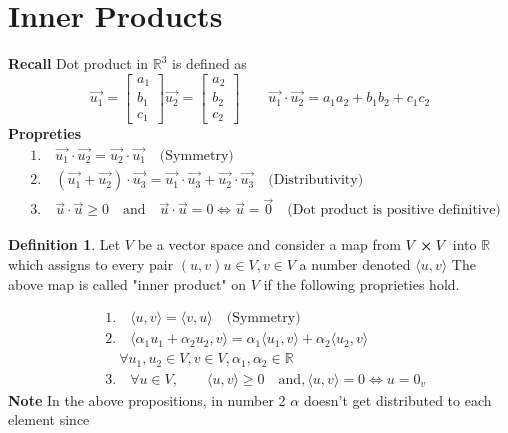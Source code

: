 \documentclass[
12pt,
]{article}
\newcommand{\la}{\langle}
\newcommand{\ra}{\rangle}
\theoremstyle{definition}
\theoremstyle{definition}
\theoremstyle{definition}
\newtheorem{Definition}{Definition}[section]
\theoremstyle{definition}
\begin{document}
\section{Inner Products}
\textbf{Recall} Dot product in $\mathbb{R}^3$ is defined as \\
\begin{equation*}
\vec{u_1} = 
	\begin{bmatrix}
	a_1 \\
	b_1 \\
	c_1
	\end{bmatrix}
\vec{u_2} = 
	\begin{bmatrix}
	a_2 \\
	b_2 \\
	c_2
	\end{bmatrix}
	\qquad \vec{u_1}\cdot{} \vec{u_2}= a_1a_2 + b_1b_2 + c_1c_2
\end{equation*}
\textbf{Propreties}
\begin{align*}
&1. \quad \vec{u_1} \cdot \vec{u_2} = \vec{u_2} \cdot \vec{u_1} \quad \text{(Symmetry)} \\
&2. \quad (\vec{u_1}+\vec{u_2})\cdot \vec{u_3} = \vec{u_1} \cdot \vec{u_3} + \vec{u_2} \cdot \vec{u_3} \quad \text{(Distributivity)} \\
&3. \quad \vec{u} \cdot \vec{u} \geq 0 \quad \text{and} \quad \vec{u} \cdot \vec{u} = 0 \iff \vec{u} = \vec{0} \quad \text{(Dot product is positive definitive)}
\end{align*}
\begin{Definition}
	Let $V$ be a vector space and consider a map from $V\cross V$ into $\mathbb{R}$ which assigns to every pair $(u,v) u \in V, v \in V$ a number denoted $ \la  u,v \ra $ \newline
	The above map is called "inner product" on $V$ if the following proprieties hold.
\end{Definition}
\begin{align*}
&1.\quad  \la  u,v\ra =  \la  v,u\ra \quad \text{(Symmetry)} \\
&2. \quad  \la  \alpha_1 u_1 + \alpha_2 u_2 , v\ra = \alpha_1  \la  u_1,v\ra + \alpha_2 \la  u_2, v\ra \\
&  \quad\forall u_1, u_2 \in V, v\in V , \alpha_1 , \alpha_2 \in \mathbb{R} \\
&3. \quad \forall u \in V , \qquad  \la  u,v\ra \geq 0 \quad \text{and} ,  \la  u,v\ra = 0 \iff u = 0_v
\end{align*}
\textbf{Note} In the above propositions, in number 2 $\alpha$ doesn't get distributed to each element since 
\end{document}
